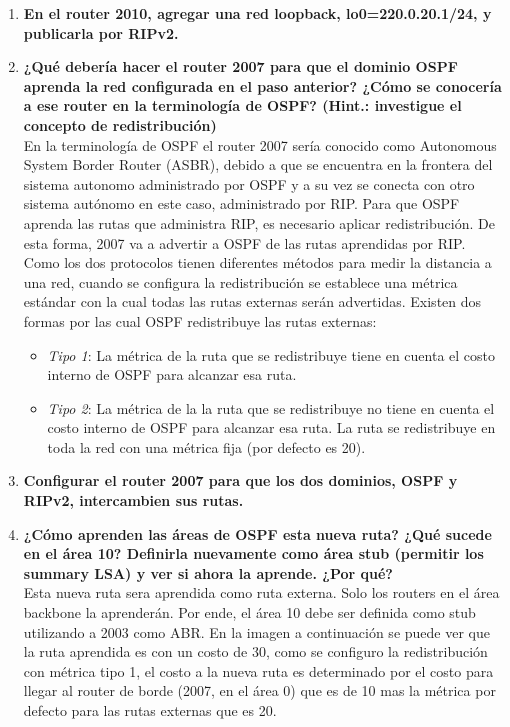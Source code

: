 \documentclass[letterpaper,12pt]{article}
\begin{document}
\begin{enumerate}
		\item \textbf{En el router 2010, agregar una red loopback, lo0=220.0.20.1/24, y publicarla por RIPv2.}
		
		\item \textbf{¿Qué debería hacer el router 2007 para que el dominio OSPF aprenda la red configurada en el paso anterior? ¿Cómo se conocería a ese router en la terminología de OSPF? (Hint.: investigue el concepto de redistribución)}\\
		En la terminología de OSPF el router 2007 sería conocido como Autonomous System Border Router (ASBR), debido a que se encuentra en la frontera del sistema autonomo administrado por OSPF y a su vez se conecta con otro sistema autónomo en este caso, administrado por RIP. Para que OSPF aprenda las rutas que administra RIP, es necesario aplicar redistribución. De esta forma, 2007 va a advertir a OSPF de las rutas aprendidas por RIP. \\
		Como los dos protocolos tienen diferentes métodos para medir la distancia a una red, cuando se configura la redistribución se establece una métrica estándar con la cual todas las rutas externas serán advertidas. Existen dos formas por las cual OSPF redistribuye las rutas externas:
		\begin{itemize}
			\item \textit{Tipo 1}: La métrica de la ruta que se redistribuye tiene en cuenta el costo interno de OSPF para alcanzar esa ruta.
			\item \textit{Tipo 2}: La métrica de la la ruta que se redistribuye no tiene en cuenta el costo interno de OSPF para alcanzar esa ruta. La ruta se redistribuye en toda la red con una métrica fija (por defecto es 20).
		\end{itemize}
		
		\item \textbf{Configurar el router 2007 para que los dos dominios, OSPF y RIPv2, intercambien sus rutas.}
		
		\item \textbf{¿Cómo aprenden las áreas de OSPF esta nueva ruta? ¿Qué sucede en el área 10? Definirla nuevamente como área stub (permitir los summary LSA) y ver si ahora la aprende. ¿Por qué?}\\
		Esta nueva ruta sera aprendida como ruta externa. Solo los routers en el área backbone la aprenderán. Por ende, el área 10 debe ser definida como stub utilizando a 2003 como ABR. En la imagen a continuación se puede ver que la ruta aprendida es con un costo de 30, como se configuro la redistribución con métrica tipo 1, el costo a la nueva ruta es determinado por el costo para llegar al router de borde (2007, en el área 0) que es de 10 mas la métrica por defecto para las rutas externas que es 20.


\end{enumerate}
\end{document}
